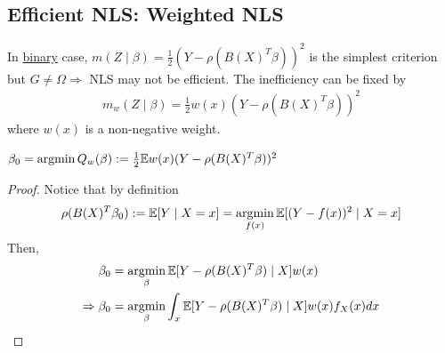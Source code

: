 \documentclass[11pt]{elegantbook}
\newcommand{\argmin}{\operatornamewithlimits{argmin}}
\begin{document}
\subsection{Efficient NLS: Weighted NLS}
In \underline{binary} case, $m(Z\mid\beta)=\frac{1}{2}(Y-\rho(B(X)^T\beta))^2$ is the simplest criterion but $G\neq \Omega \Rightarrow$ NLS may not be efficient. The inefficiency can be fixed by
\begin{equation}
    \begin{aligned}
        m_w(Z\mid\beta)=\frac{1}{2}w(x)(Y-\rho(B(X)^T\beta))^2
    \end{aligned}
    \nonumber
\end{equation}
where $w(x)$ is a non-negative weight.

\begin{claim}
    $\beta_0=\argmin Q_w(\beta):=\frac{1}{2}\mathbb{E}w(x)(Y-\rho(B(X)^T\beta))^2$
\end{claim}
\begin{proof}
    Notice that by definition
    \begin{equation}
        \begin{aligned}
            \rho(B(X)^T\beta_0):=\mathbb{E}[Y\mid X=x]=\argmin_{f(x)}\mathbb{E}[(Y-f(x))^2\mid X=x]
        \end{aligned}
        \nonumber
    \end{equation}
    Then,
    \begin{equation}
        \begin{aligned}
            \beta_0&=\argmin_{\beta}\mathbb{E}[Y-\rho(B(X)^T\beta)\mid X]w(x)\\
            \Rightarrow \beta_0&=\argmin_{\beta}\int_x\mathbb{E}[Y-\rho(B(X)^T\beta)\mid X]w(x)f_X(x)dx
        \end{aligned}
        \nonumber
    \end{equation}
\end{proof}
\end{document}

